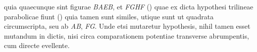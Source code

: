 %
quia quaecunque sint figurae \textit{BAEB}, et \textit{FGHF}\protect{}
(\protect\vphantom)%
quae ex dicta hypothesi\protect{}
trilineae parabolicae\protect{} fiunt%
\protect\vphantom()
quia tamen sunt similes,
utique sunt ut quadrata circumscripta,\protect{}
seu ab \textit{AB}, \textit{FG}.
Unde etsi mutaretur hypothesis,\protect{}
nihil tamen esset mutandum in dictis,
nisi circa comparationem potentiae transverse abrumpentis,\protect{}
cum directe evellente.%
%
\protect{}
%
\pend%
\count{}
\count{}
\count{}
%

